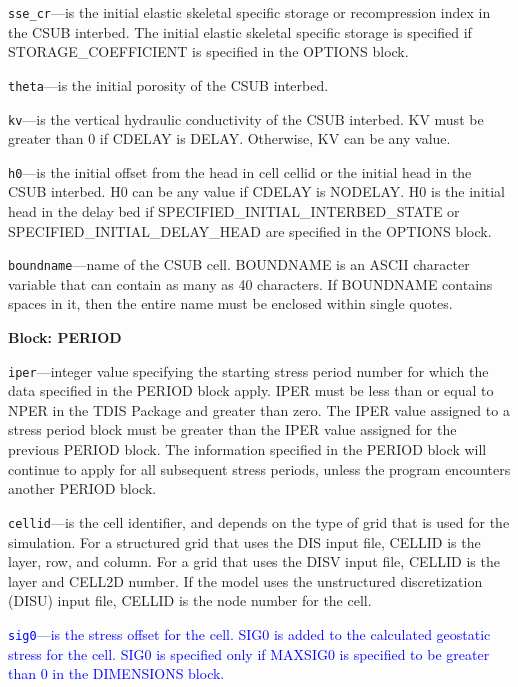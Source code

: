 \begin{description}
\item \texttt{sse\_cr}---is the initial elastic skeletal specific storage or recompression index in the CSUB interbed. The initial elastic skeletal specific storage is specified if STORAGE\_COEFFICIENT is specified in the OPTIONS block.

\item \texttt{theta}---is the initial porosity of the CSUB interbed.

\item \texttt{kv}---is the vertical hydraulic conductivity of the CSUB interbed. KV must be greater than 0 if CDELAY is DELAY. Otherwise, KV can be any value.

\item \texttt{h0}---is the initial offset from the head in cell cellid or the initial head in the CSUB interbed. H0 can be any value if CDELAY is NODELAY. H0 is the initial head in the delay bed if SPECIFIED\_INITIAL\_INTERBED\_STATE or SPECIFIED\_INITIAL\_DELAY\_HEAD are specified in the OPTIONS block.

\item \texttt{boundname}---name of the CSUB cell.  BOUNDNAME is an ASCII character variable that can contain as many as 40 characters.  If BOUNDNAME contains spaces in it, then the entire name must be enclosed within single quotes.

\end{description}
\item \textbf{Block: PERIOD}

\begin{description}
\item \texttt{iper}---integer value specifying the starting stress period number for which the data specified in the PERIOD block apply.  IPER must be less than or equal to NPER in the TDIS Package and greater than zero.  The IPER value assigned to a stress period block must be greater than the IPER value assigned for the previous PERIOD block.  The information specified in the PERIOD block will continue to apply for all subsequent stress periods, unless the program encounters another PERIOD block.

\item \texttt{cellid}---is the cell identifier, and depends on the type of grid that is used for the simulation.  For a structured grid that uses the DIS input file, CELLID is the layer, row, and column.   For a grid that uses the DISV input file, CELLID is the layer and CELL2D number.  If the model uses the unstructured discretization (DISU) input file, CELLID is the node number for the cell.

\item \textcolor{blue}{\texttt{sig0}---is the stress offset for the cell. SIG0 is added to the calculated geostatic stress for the cell. SIG0 is specified only if MAXSIG0 is specified to be greater than 0 in the DIMENSIONS block.}

\end{description}

